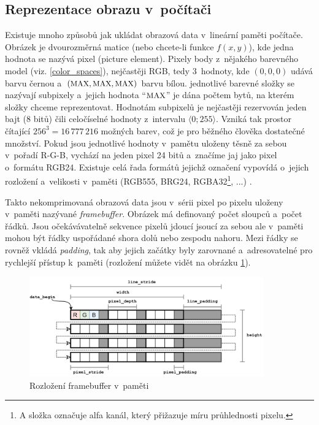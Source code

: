 \documentclass[11pt, a4paper, titlepage]{article}
\renewcommand{\uv}[1]{``#1''}
\begin{document}
\subsection{Reprezentace obrazu v~počítači}
Existuje mnoho způsobů jak ukládat obrazová data v~lineární paměti počítače.
Obrázek je dvourozměrná matice (nebo chcete-li funkce $f(x,y)$), kde jedna hodnota se nazývá pixel (picture element).
Pixely body z~nějakého barevného model (viz. \ref{color_spaces}), nejčastěji RGB, tedy 3~hodnoty, kde $(0,0,0)$ udává barvu černou a~$(\text{\small MAX}, \text{\small MAX}, \text{\small MAX})$ barvu bílou.
jednotlivé barevné složky se nazývají subpixely a~jejich hodnota \uv{$\text{\small MAX}$} je dána počtem bytů, na kterém složky chceme reprezentovat.
Hodnotám subpixelů je nejčastěji rezervován jeden bajt (8 bitů) čili celočíselné hodnoty z~intervalu $\langle0;255\rangle$.
Vzniká tak prostor čítající $256^3 = 16\,777\,216$ možných barev, což je pro běžného člověka dostatečné množství.
Pokud jsou jednotlivé hodnoty v~pamětu uloženy těsně za sebou v~pořadí R-G-B, vychází na jeden pixel 24 bitů a~značíme jaj jako pixel o~formátu RGB24.
Existuje celá řada formátů jejichž označení vypovídá o~jejich rozložení a~velikosti v~paměti (RGB555, BRG24, RGBA32\footnote{A složka označuje alfa kanál, který přižazuje míru průhlednosti pixelu.}, ...) \cite{mul_opora}.

Takto nekomprimovaná obrazová data jsou v~sérii pixel po pixelu uloženy v~paměti nazývané \emph{framebuffer}.
Obrázek má definovaný počet sloupců a~počet řádků.
Jsou očekávávatelně sekvence pixelů jdoucí jsoucí za sebou ale v~paměti mohou být řádky uspořádané shora dolů nebo zespodu nahoru.
Mezi řádky se rovněž vkládá \emph{padding}, tak aby jejich začátky byly zarovnané a~adresovatelné pro rychlejší přístup k~paměti (rozložení můžete vidět na obrázku \ref{fig:framebuffer}).

\begin{figure}[h]
    \centering
    \includegraphics[width=0.9\textwidth]{framebuffer.png}
    \caption{Rozložení framebuffer v~paměti \cite{Whatdoes20:online}}
    \label{fig:framebuffer}
\end{figure}
\end{document}
